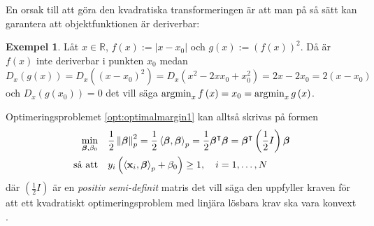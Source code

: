 \documentclass[a4paper, 12pt]{report}
\theoremstyle{definition}
\newtheorem{ex}{Exempel}[section]
\theoremstyle{remark}
\newcommand{\bfbeta}{{\boldsymbol{\beta}}}
\newcommand{\bfx}{\mathbf{x}}
\newcommand{\llangle}{\left\langle}
\newcommand{\rrangle}{\right\rangle}
\newcommand{\inner}[2]{\llangle #1, #2 \rrangle}
\begin{document}
En orsak till att göra den kvadratiska transformeringen är att man på så sätt kan garantera att objektfunktionen är deriverbar:
\begin{ex}
	Låt $x\in\mathbb{R}$, $f\left(x\right):=|x-x_0|$ och $g\left(x\right):=\left(f\left(x\right)\right)^2$. Då är $f\left(x\right)$ inte deriverbar i punkten $x_0$ medan $D_x\left(g\left(x\right)\right)=D_x\left(\left(x-x_0\right)^2\right)=D_x\left(x^2-2xx_0+x_0^2\right)=2x-2x_0=2\left(x-x_0\right)$ och $D_x\left(g\left(x_0\right)\right)=0$ det vill säga $\operatornamewithlimits{argmin}_x f\left(x\right) = x_0 = \operatornamewithlimits{argmin}_x g\left(x\right)$.
\end{ex}
Optimeringsproblemet \ref{opt:optimalmargin1} kan alltså skrivas på formen 
\begin{equation*}
\begin{aligned}
\operatornamewithlimits{min}_{\bfbeta,\beta_0} & & &\frac{1}{2}\left\|\bfbeta
\right\|_p^2=\frac{1}{2}\inner{\bfbeta}{\bfbeta}_p=\frac{1}{2}\bfbeta^\intercal\bfbeta=\bfbeta^\intercal\left(\frac{1}{2}I\right)\bfbeta\\
\text{så att} & & &y_i\left(\inner{\bfx_i}{\bfbeta}_p+\beta_0\right)\geq 1,\quad i=1,\dots,N
\end{aligned}
\end{equation*}
där $\left( \frac{1}{2}I \right)$ är en \emph{positiv semi-definit} matris det vill säga den uppfyller kraven för att ett kvadratiskt optimeringsproblem med linjära lösbara krav ska vara konvext \cite{Boyd}.
\end{document}
